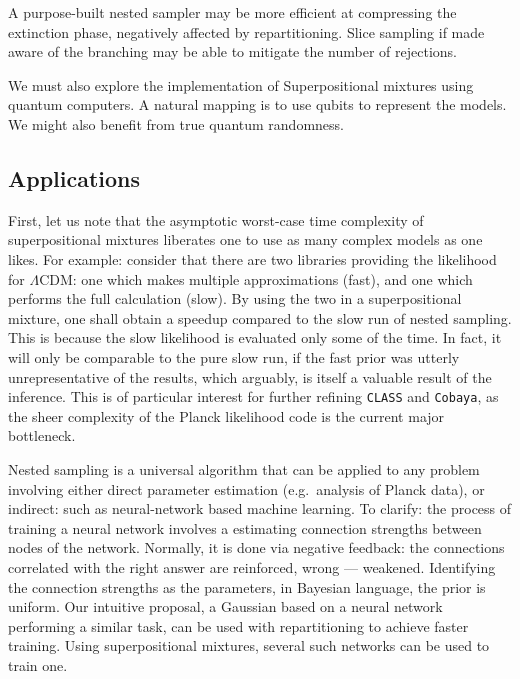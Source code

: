 \documentclass[usenatbib]{mnras}
\begin{document}
A purpose-built nested sampler may be more efficient at compressing
the extinction phase, negatively affected by repartitioning. Slice
sampling if made aware of the branching may be able to mitigate the
number of rejections. 

We must also explore the implementation of Superpositional mixtures
using quantum computers. A natural mapping is to use qubits to
represent the models. We might also benefit from true quantum
randomness.



\subsection{Applications}\label{sec:applications}
First, let us note that the asymptotic worst-case time complexity of
superpositional mixtures liberates one to use as many complex models
as one likes. For example: consider that there are two libraries
providing the likelihood for \(\Lambda\)CDM: one which makes multiple
approximations (fast), and one which performs the full calculation
(slow). By using the two in a superpositional mixture, one shall
obtain a speedup compared to the slow run of nested sampling. This is
because the slow likelihood is evaluated only some of the time. In
fact, it will only be comparable to the pure slow run, if the fast
prior was utterly unrepresentative of the results, which arguably, is
itself a valuable result of the inference. This is of particular
interest for further refining \texttt{CLASS} and \texttt{Cobaya}, as
the sheer complexity of the Planck likelihood code is the current
major bottleneck.

Nested sampling is a universal algorithm that can be applied to any
problem involving either direct parameter estimation (e.g.~analysis of
Planck data), or indirect: such as neural-network based machine
learning. To clarify: the process of training a neural network
involves a estimating connection strengths between nodes of the
network. Normally, it is done via negative feedback: the connections
correlated with the right answer are reinforced, wrong --- weakened.
Identifying the connection strengths as the parameters, in Bayesian
language, the prior is uniform. Our intuitive proposal, a Gaussian
based on a neural network performing a similar task, can be used with
repartitioning to achieve faster training. Using superpositional
mixtures, several such networks can be used to train one.
\end{document}
